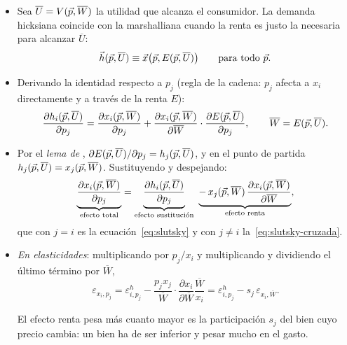 \documentclass[11pt]{article}
\begin{document}
\begin{itemize}
\item Sea $\overline{U}=V(\vec{p},\overline{W})$ la utilidad que alcanza el consumidor. La demanda hicksiana coincide con la marshalliana cuando la renta es justo la necesaria para alcanzar $\overline{U}$:
  \begin{equation*}
  \vec{h}(\vec{p},\overline{U})\equiv \vec{x}\big(\vec{p},E(\vec{p},\overline{U})\big)\qquad\text{para todo }\vec{p}.
  \end{equation*}
\item Derivando la identidad respecto a $p_j$ (regla de la cadena: $p_j$ afecta a $x_i$ directamente y a través de la renta $E$):
  \begin{equation*}
  \frac{\partial h_i(\vec{p},\overline{U})}{\partial p_j}=\frac{\partial x_i(\vec{p},\overline{W})}{\partial p_j}+\frac{\partial x_i(\vec{p},\overline{W})}{\partial\overline{W}}\cdot\frac{\partial E(\vec{p},\overline{U})}{\partial p_j},\qquad\overline{W}=E(\vec{p},\overline{U}).
  \end{equation*}
\item Por el \emph{lema de }, $\partial E(\vec{p},\overline{U})/\partial p_j=h_j(\vec{p},\overline{U})$, y en el punto de partida $h_j(\vec{p},\overline{U})=x_j(\vec{p},\overline{W})$. Sustituyendo y despejando:
  \begin{equation*}
  \underbrace{\frac{\partial x_i(\vect{p},\overline{W})}{\partial p_j}}_{\text{efecto total}}=\underbrace{\frac{\partial h_i(\vect{p},\overline{U})}{\partial p_j}}_{\text{efecto sustitución}}\ \underbrace{-\,x_j(\vect{p},\overline{W})\,\frac{\partial x_i(\vect{p},\overline{W})}{\partial\overline{W}}}_{\text{efecto renta}},
  \end{equation*}
  que con $j=i$ es la ecuación~\eqref{eq:slutsky} y con $j\neq i$ la~\eqref{eq:slutsky-cruzada}.\findemo
\item \emph{En elasticidades}: multiplicando por $p_j/x_i$ y multiplicando y dividiendo el último término por $\overline{W}$,
  \begin{equation*}
  \varepsilon_{x_i,p_j}=\varepsilon^{h}_{i,p_j}-\frac{p_jx_j}{\overline{W}}\cdot\frac{\partial x_i}{\partial\overline{W}}\frac{\overline{W}}{x_i}=\varepsilon^{h}_{i,p_j}-s_j\,\varepsilon_{x_i,\overline{W}}.
  \end{equation*}
  \findemo

  El efecto renta pesa más cuanto mayor es la participación $s_j$ del bien cuyo precio cambia: un bien  ha de ser inferior y pesar mucho en el gasto.
\end{itemize}
\end{document}
